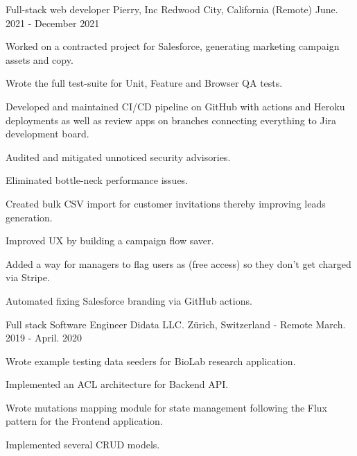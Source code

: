 \begin{cventries}
  \cventry
    {Full-stack web developer} %
    {Pierry, Inc} %
    {Redwood City, California (Remote)} %
    {June. 2021 - December 2021} %
    {
      \begin{cvitems} %
        \item {Worked on a contracted project for Salesforce, generating marketing campaign assets and copy.}
        \item {Wrote the full test-suite for Unit, Feature and Browser QA tests.}
        \item {Developed and maintained CI/CD pipeline on GitHub with actions and Heroku deployments as well as review apps on branches connecting everything to Jira development board.}
        \item {Audited and mitigated unnoticed security advisories.}
        \item {Eliminated bottle-neck performance issues.}
        \item {Created bulk CSV import for customer invitations thereby improving leads generation.}
        \item {Improved UX by building a campaign flow saver.}
        \item {Added a way for managers to flag users as (free access) so they don't get charged via Stripe.}
        \item {Automated fixing Salesforce branding via GitHub actions.}
      \end{cvitems}
     }

  \cventry
    {Full stack Software Engineer} %
    {Didata LLC.} %
    {Zürich, Switzerland - Remote} %
    {March. 2019 - April. 2020} %
    {
      \begin{cvitems} %
        \item {Wrote example testing data seeders for BioLab research application.}
        \item {Implemented an ACL architecture for Backend API.}
        \item {Wrote mutations mapping module for state management following the Flux pattern for the Frontend application.}
        \item {Implemented several CRUD models.}
      \end{cvitems}
    }

\end{cventries}
